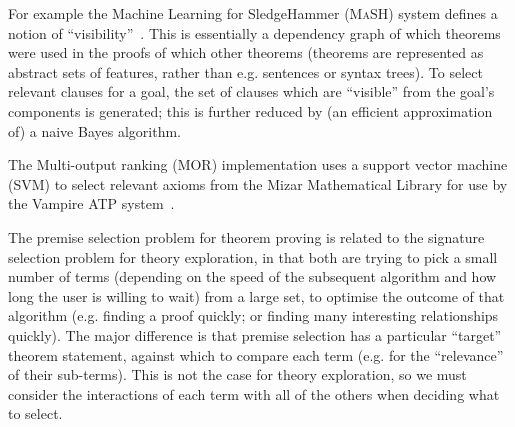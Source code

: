For example the Machine Learning for SledgeHammer (\textsc{MaSH}) system
defines a notion of ``visibility''~\cite{kuhlwein2013mash}. This is essentially
a dependency graph of which theorems were used in the proofs of which other
theorems (theorems are represented as abstract sets of features, rather than
e.g. sentences or syntax trees). To select relevant clauses for a goal, the
set of clauses which are ``visible'' from the goal's components is generated;
this is further reduced by (an efficient approximation of) a naive Bayes
algorithm.

The Multi-output ranking (\textsc{MOR}) implementation uses a support vector
machine (SVM) to select relevant axioms from the Mizar Mathematical Library for
use by the Vampire ATP system~\cite{alama2014premise}.

The premise selection problem for theorem proving is related to the signature
selection problem for theory exploration, in that both are trying to pick a
small number of terms (depending on the speed of the subsequent algorithm and
how long the user is willing to wait) from a large set, to optimise the
outcome of that algorithm (e.g. finding a proof quickly; or finding many
interesting relationships quickly). The major difference is that premise
selection has a particular ``target'' theorem statement, against which to
compare each term (e.g. for the ``relevance'' of their sub-terms). This is not
the case for theory exploration, so we must consider the interactions of each
term with all of the others when deciding what to select.
